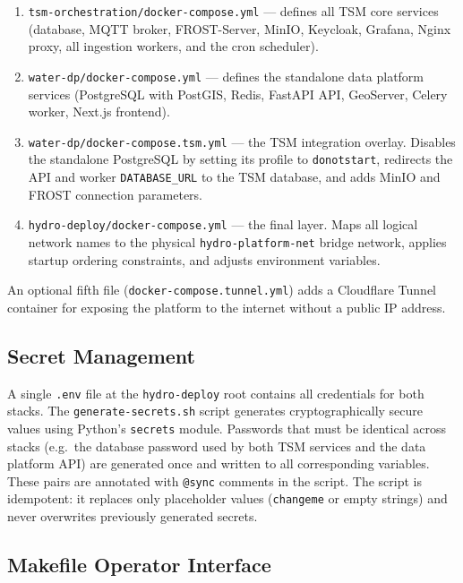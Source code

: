 \begin{enumerate}
  \item \texttt{tsm-orchestration/docker-compose.yml} --- defines all TSM core services
        (database, MQTT broker, FROST-Server, MinIO, Keycloak, Grafana, Nginx proxy,
        all ingestion workers, and the cron scheduler).
  \item \texttt{water-dp/docker-compose.yml} --- defines the standalone data platform
        services (PostgreSQL with PostGIS, Redis, FastAPI API, GeoServer, Celery worker,
        Next.js frontend).
  \item \texttt{water-dp/docker-compose.tsm.yml} --- the TSM integration overlay. Disables
        the standalone PostgreSQL by setting its profile to \texttt{donotstart}, redirects
        the API and worker \texttt{DATABASE\_URL} to the TSM database, and adds MinIO
        and FROST connection parameters.
  \item \texttt{hydro-deploy/docker-compose.yml} --- the final layer. Maps all logical
        network names to the physical \texttt{hydro-platform-net} bridge network, applies
        startup ordering constraints, and adjusts environment variables.
\end{enumerate}

An optional fifth file (\texttt{docker-compose.tunnel.yml}) adds a Cloudflare Tunnel
container for exposing the platform to the internet without a public IP address.

\subsection{Secret Management}
\label{sec:arch-deploy-secrets}

A single \texttt{.env} file at the \texttt{hydro-deploy} root contains all credentials for
both stacks. The \texttt{generate-secrets.sh} script generates cryptographically secure values
using Python's \texttt{secrets} module. Passwords that must be identical across stacks (e.g.\
the database password used by both TSM services and the data platform API) are generated
once and written to all corresponding variables. These pairs are annotated with \texttt{@sync}
comments in the script. The script is idempotent: it replaces only placeholder values
(\texttt{changeme} or empty strings) and never overwrites previously generated secrets.

\subsection{Makefile Operator Interface}
\label{sec:arch-deploy-makefile}

